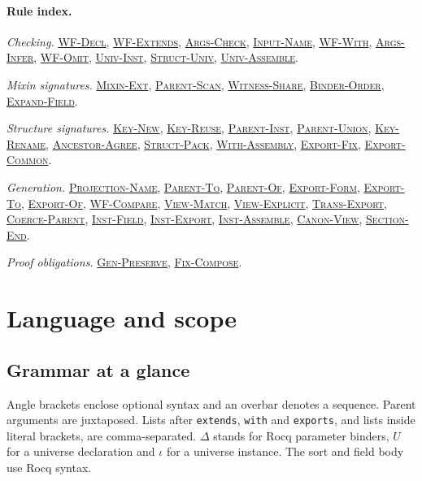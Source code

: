 \documentclass{article}
\newcommand{\ttt}[1]{\texttt{#1}}
\newcommand{\ruse}[1]{\hyperlink{rule-#1}{\textsc{#1}}}
\begin{document}
\paragraph{Rule index.}
{\small\raggedright
\textit{Checking.} \ruse{WF-Decl}, \ruse{WF-Extends}, \ruse{Args-Check},
\ruse{Input-Name}, \ruse{WF-With}, \ruse{Args-Infer}, \ruse{WF-Omit}, \ruse{Univ-Inst},
\ruse{Struct-Univ}, \ruse{Univ-Assemble}.\par
\textit{Mixin signatures.} \ruse{Mixin-Ext}, \ruse{Parent-Scan},
\ruse{Witness-Share}, \ruse{Binder-Order}, \ruse{Expand-Field}.\par
\textit{Structure signatures.} \ruse{Key-New}, \ruse{Key-Reuse},
\ruse{Parent-Inst}, \ruse{Parent-Union}, \ruse{Key-Rename}, \ruse{Ancestor-Agree},
\ruse{Struct-Pack}, \ruse{With-Assembly}, \ruse{Export-Fix},
\ruse{Export-Common}.\par
\textit{Generation.} \ruse{Projection-Name}, \ruse{Parent-To}, \ruse{Parent-Of}, \ruse{Export-Form},
\ruse{Export-To}, \ruse{Export-Of}, \ruse{WF-Compare}, \ruse{View-Match},
\ruse{View-Explicit}, \ruse{Trans-Export}, \ruse{Coerce-Parent}, \ruse{Inst-Field}, \ruse{Inst-Export}, \ruse{Inst-Assemble},
\ruse{Canon-View}, \ruse{Section-End}.\par
\textit{Proof obligations.} \ruse{Gen-Preserve}, \ruse{Fix-Compose}.\par}

\section{Language and scope}
\label{sec:language}

\subsection{Grammar at a glance}
Angle brackets enclose optional syntax and an overbar denotes a sequence.
Parent arguments are juxtaposed. Lists after \ttt{extends}, \ttt{with}
and \ttt{exports}, and lists inside literal brackets, are comma-separated.
$\Delta$ stands for Rocq parameter binders, $U$ for a universe declaration
and $\iota$ for a universe instance. The sort and field body use Rocq syntax.
\end{document}
